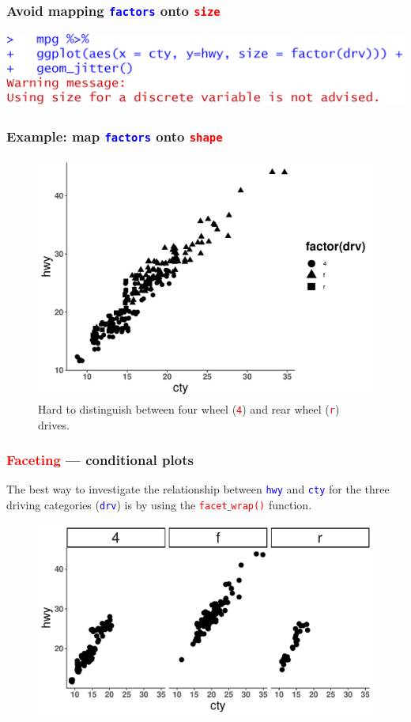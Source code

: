 \documentclass{beamer}
\begin{document}
\begin{frame}\frametitle{Avoid mapping \texttt{\textcolor{blue}{factors}} onto \texttt{\textcolor{red}{size}}}
\includegraphics[width=0.99\linewidth]{PlotsLec2/Warning1}
\end{frame}

\begin{frame}\frametitle{Example: map \texttt{\textcolor{blue}{factors}} onto \texttt{\textcolor{red}{shape}}}
\begin{figure}
\includegraphics[width=0.90\linewidth]{PlotsLec2/drv_to_shape}
\caption{{\small Hard to distinguish between four wheel (\textcolor{red}{\texttt{4}}) and rear wheel (\textcolor{red}{\texttt{r}}) drives.}}
\end{figure}
\end{frame}

\begin{frame}\frametitle{\textcolor{red}{Faceting} --- conditional plots}
The best way to investigate the relationship between \texttt{\textcolor{blue}{hwy}} and \texttt{\textcolor{blue}{cty}} for the three driving categories (\texttt{\textcolor{blue}{drv}}) is by using the \texttt{\textcolor{red}{facet}$\_$\textcolor{red}{wrap()}} function.
\begin{figure}
\includegraphics[width=0.99\linewidth]{PlotsLec2/facet1}
\end{figure}
\end{frame}
\end{document}
